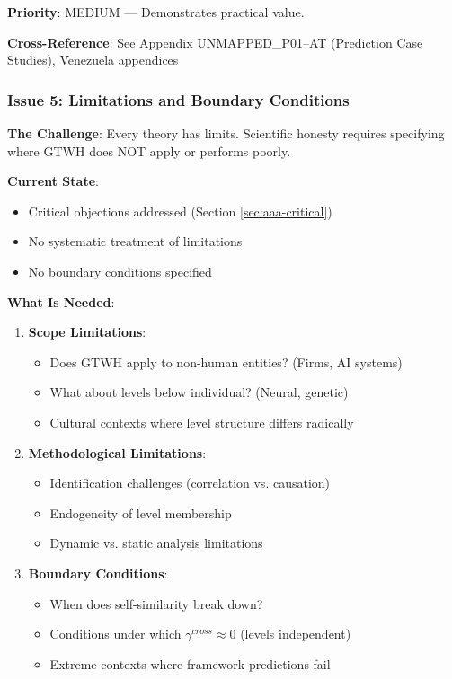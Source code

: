 \begin{tcolorbox}[colback=yellow!5!white, colframe=yellow!75!black, title=Status: One Example Only]
\textbf{Priority}: \colorbox{yellow!20}{MEDIUM} --- Demonstrates practical value.

\textbf{Cross-Reference}: See Appendix UNMAPPED_P01--AT (Prediction Case Studies), Venezuela appendices
\end{tcolorbox}

\subsubsection{Issue 5: Limitations and Boundary Conditions}

\begin{tcolorbox}[colback=yellow!5!white, colframe=yellow!75!black, title=Status: Not Addressed]
\textbf{The Challenge}: Every theory has limits. Scientific honesty requires 
specifying where GTWH does NOT apply or performs poorly.

\textbf{Current State}: 
\begin{itemize}[nosep]
\item Critical objections addressed (Section \ref{sec:aaa-critical})
\item No systematic treatment of limitations
\item No boundary conditions specified
\end{itemize}

\textbf{What Is Needed}:
\begin{enumerate}
\item \textbf{Scope Limitations}:
    \begin{itemize}[nosep]
    \item Does GTWH apply to non-human entities? (Firms, AI systems)
    \item What about levels below individual? (Neural, genetic)
    \item Cultural contexts where level structure differs radically
    \end{itemize}

\item \textbf{Methodological Limitations}:
    \begin{itemize}[nosep]
    \item Identification challenges (correlation vs. causation)
    \item Endogeneity of level membership
    \item Dynamic vs. static analysis limitations
    \end{itemize}

\item \textbf{Boundary Conditions}:
    \begin{itemize}[nosep]
    \item When does self-similarity break down?
    \item Conditions under which $\gamma^{cross} \approx 0$ (levels independent)
    \item Extreme contexts where framework predictions fail
    \end{itemize}


\end{enumerate}
\end{tcolorbox}
